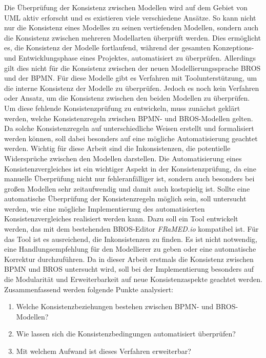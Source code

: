 Die Überprüfung der Konsistenz zwischen Modellen wird auf dem Gebiet von UML aktiv erforscht und es existieren viele verschiedene Ansätze.
So kann nicht nur die Konsistenz eines Modelles zu seinen vertiefenden Modellen, sondern auch die Konsistenz zwischen mehreren Modellarten überprüft werden.
Dies ermöglicht es, die Konsistenz der Modelle fortlaufend, während der gesamten Konzeptions- und Entwicklungsphase eines Projektes, automatisiert zu überprüfen. 
Allerdings gilt dies nicht für die Konsistenz zwischen der neuen Modellierungssprache BROS und der BPMN.
Für diese Modelle gibt es Verfahren mit Toolunterstützung, um die interne Konsistenz der Modelle zu überprüfen.
Jedoch es noch kein Verfahren oder Ansatz, um die Konsistenz zwischen den beiden Modellen zu überprüfen.
Um diese fehlende Konsistenzprüfung zu entwickeln, muss zunächst geklärt werden, welche Konsistenzregeln zwischen BPMN- und BROS-Modellen gelten.
Da solche Konsistenzregeln auf unterschiedliche Weisen erstellt und formalisiert werden können, soll dabei besonders auf eine mögliche Automatisierung geachtet werden.
Wichtig für diese Arbeit sind die Inkonsistenzen, die potentielle Widersprüche zwischen den Modellen darstellen. 
Die Automatisierung eines Konsistenzvergleiches ist ein wichtiger Aspekt in der Konsistenzprüfung, da eine manuelle Überprüfung nicht nur fehleranfälliger ist, sondern auch besonders bei großen Modellen sehr zeitaufwendig und damit auch kostspielig ist.
Sollte eine automatische Überprüfung der Konsistenzregeln möglich sein, soll untersucht werden, wie eine mögliche Implementierung des automatisierten Konsistenzvergleiches realisiert werden kann.
Dazu soll ein Tool entwickelt werden, das mit dem bestehenden BROS-Editor \emph{FRaMED.io} kompatibel ist.
Für das Tool ist es ausreichend, die Inkonsistenzen zu finden.
Es ist nicht notwendig, eine Handlungsempfehlung für den Modellierer zu geben oder eine automatische Korrektur durchzuführen. 
Da in dieser Arbeit erstmals die Konsistenz zwischen BPMN und BROS untersucht wird, soll bei der Implementierung besonders auf die Modularität und Erweiterbarkeit auf neue Konsistenzaspekte geachtet werden.
Zusammenfassend werden folgende Punkte analysiert:

\begin{enumerate}
    \item Welche Konsistenzbeziehungen bestehen zwischen BPMN- und BROS-Modellen?
    \item Wie lassen sich die Konsistenzbedingungen automatisiert überprüfen?
    \item Mit welchem Aufwand ist dieses Verfahren erweiterbar?
\end{enumerate}

